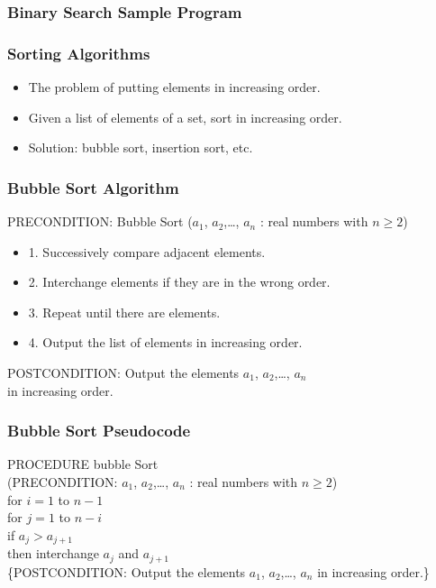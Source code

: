 \documentclass{beamer}
\begin{document}
\begin{frame}
\frametitle{Binary Search Sample Program}
 \end{frame}


\begin{frame}
\frametitle{\huge Sorting Algorithms}
\begin{itemize} 
\Large
\item <1-> The problem of putting elements in increasing order.
\item <2-> Given a list of elements of a set, sort in increasing order. 
\item <3-> Solution: bubble sort, insertion sort, etc.
\end{itemize}
\end{frame}


\begin{frame}
\frametitle{\huge Bubble Sort Algorithm}
PRECONDITION: Bubble Sort ($a_1$, $a_2$,\ldots, $a_n$ : real numbers with $n \ge 2$) 
\begin{itemize} 
\Large
\item <1-> 1. Successively compare adjacent elements.
\item <2-> 2. Interchange elements if they are in the wrong order.
\item <3-> 3. Repeat until there are elements.
\item <4-> 4. Output the list of elements in increasing order.
\end{itemize}
POSTCONDITION: Output the elements $a_1$, $a_2$,\ldots, $a_n$ \\  in increasing order. 
\end{frame}


\begin{frame}
\frametitle{\huge Bubble Sort Pseudocode}
\Large
PROCEDURE bubble Sort \\ (PRECONDITION: $a_1$, $a_2$,\ldots, $a_n$ : real numbers with $n \ge 2$) \\
\quad for $i  = 1$ to $ n - 1$ \\
\qquad for $j = 1$ to $n - i$ \\
\qquad \:\:  if $a_j > a_{j+1}$  \\ 
\qquad \:\: then interchange $a_j$ and $a_{j+ 1}$ \\
\{POSTCONDITION: Output the elements $a_1$, $a_2$,\ldots, $a_n$ in increasing order.\}
 \end{frame}
\end{document}
